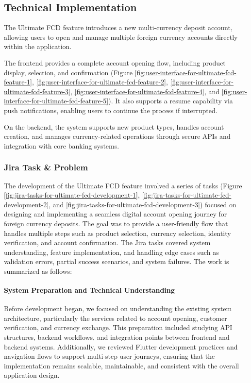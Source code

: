 \documentclass[12pt,oneside,openright,a4paper]{cpe-english-project}
\begin{document}
\subsection{Technical Implementation}

The Ultimate FCD feature introduces a new multi-currency deposit
account, allowing users to open and manage multiple foreign currency
accounts directly within the application.

The frontend provides a complete account opening flow, including product
display, selection, and confirmation (Figure \ref{fig:user-interface-for-ultimate-fcd-feature-1}, \ref{fig:user-interface-for-ultimate-fcd-feature-2}, \ref{fig:user-interface-for-ultimate-fcd-feature-3}, \ref{fig:user-interface-for-ultimate-fcd-feature-4}, and \ref{fig:user-interface-for-ultimate-fcd-feature-5}). It also supports a resume
capability via push notifications, enabling users to continue the
process if interrupted.

On the backend, the system supports new product types, handles account
creation, and manages currency-related operations through secure APIs
and integration with core banking systems.

\subsubsection{Jira Task \& Problem}

The development of the Ultimate FCD feature involved a series of tasks (Figure \ref{fig:jira-tasks-for-ultimate-fcd-development-1}, \ref{fig:jira-tasks-for-ultimate-fcd-development-2}, and \ref{fig:jira-tasks-for-ultimate-fcd-development-3})
focused on designing and implementing a seamless digital account opening
journey for foreign currency deposits. The goal was to provide a
user-friendly flow that handles multiple steps such as product
selection, currency selection, identity verification, and account
confirmation. The Jira tasks covered system understanding, feature
implementation, and handling edge cases such as validation errors,
partial success scenarios, and system failures. The work is summarized
as follows:

\paragraph{System Preparation and Technical Understanding}

Before development began, we focused on understanding the existing
system architecture, particularly the services related to account
opening, customer verification, and currency exchange. This preparation
included studying API structures, backend workflows, and integration
points between frontend and backend systems. Additionally, we reviewed
Flutter development practices and navigation flows to support multi-step
user journeys, ensuring that the implementation remains scalable,
maintainable, and consistent with the overall application design.
\end{document}
